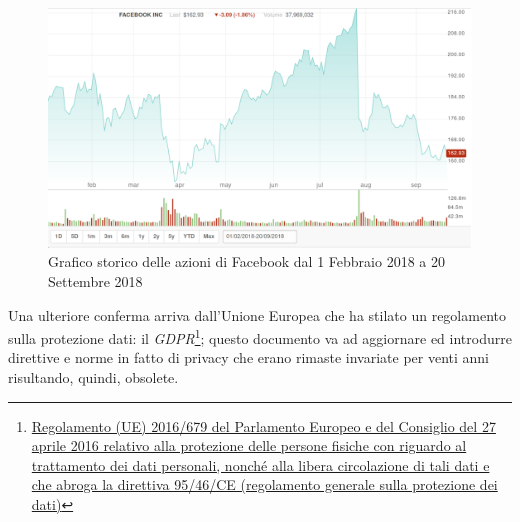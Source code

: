 \begin{figure}
    \centering
    \includegraphics[width=\textwidth]{images/facebookstock.png}
    \caption{Grafico storico delle azioni di Facebook dal 1 Febbraio 2018 a 20 Settembre 2018}
\end{figure}
Una ulteriore conferma arriva dall'Unione Europea che ha stilato un regolamento sulla protezione dati: il \textit{GDPR}\footnote{\href{https://eur-lex.europa.eu/legal-content/IT/TXT/HTML/?uri=CELEX:32016R0679}{Regolamento (UE) 2016/679 del Parlamento Europeo e del Consiglio del 27 aprile 2016 relativo alla protezione delle persone fisiche con riguardo al trattamento dei dati personali, nonché alla libera circolazione di tali dati e che abroga la direttiva 95/46/CE (regolamento generale sulla protezione dei dati)}}; questo documento va ad aggiornare ed introdurre direttive e norme in fatto di privacy che erano rimaste invariate per venti anni risultando, quindi, obsolete.\newline

